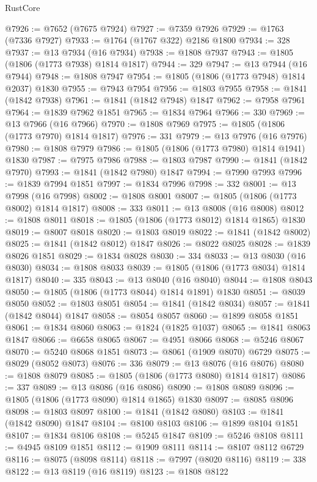 \begin{lexlean}{RustCore}
\begin{coremodule}
@7926 := @7652 (@7675 @7924)
@7927 := @7359 @7926
@7929 := @1763 (@7336 @7927)
@7933 := @1764 (@1767 @322) @2186 @1800
@7934 := 328
@7937 := @13 @7934 (@16 @7934)
@7938 := @1808 @7937
@7943 := @1805 (@1806 (@1773 @7938) @1814 @1817)
@7944 := 329
@7947 := @13 @7944 (@16 @7944)
@7948 := @1808 @7947
@7954 := @1805 (@1806 (@1773 @7948) @1814 @2037) @1830
@7955 := @7943 @7954
@7956 := @1803 @7955
@7958 := @1841 (@1842 @7938)
@7961 := @1841 (@1842 @7948) @1847
@7962 := @7958 @7961
@7964 := @1839 @7962 @1851
@7965 := @1834 @7964
@7966 := 330
@7969 := @13 @7966 (@16 @7966)
@7970 := @1808 @7969
@7975 := @1805 (@1806 (@1773 @7970) @1814 @1817)
@7976 := 331
@7979 := @13 @7976 (@16 @7976)
@7980 := @1808 @7979
@7986 := @1805 (@1806 (@1773 @7980) @1814 @1941) @1830
@7987 := @7975 @7986
@7988 := @1803 @7987
@7990 := @1841 (@1842 @7970)
@7993 := @1841 (@1842 @7980) @1847
@7994 := @7990 @7993
@7996 := @1839 @7994 @1851
@7997 := @1834 @7996
@7998 := 332
@8001 := @13 @7998 (@16 @7998)
@8002 := @1808 @8001
@8007 := @1805 (@1806 (@1773 @8002) @1814 @1817)
@8008 := 333
@8011 := @13 @8008 (@16 @8008)
@8012 := @1808 @8011
@8018 := @1805 (@1806 (@1773 @8012) @1814 @1865) @1830
@8019 := @8007 @8018
@8020 := @1803 @8019
@8022 := @1841 (@1842 @8002)
@8025 := @1841 (@1842 @8012) @1847
@8026 := @8022 @8025
@8028 := @1839 @8026 @1851
@8029 := @1834 @8028
@8030 := 334
@8033 := @13 @8030 (@16 @8030)
@8034 := @1808 @8033
@8039 := @1805 (@1806 (@1773 @8034) @1814 @1817)
@8040 := 335
@8043 := @13 @8040 (@16 @8040)
@8044 := @1808 @8043
@8050 := @1805 (@1806 (@1773 @8044) @1814 @1891) @1830
@8051 := @8039 @8050
@8052 := @1803 @8051
@8054 := @1841 (@1842 @8034)
@8057 := @1841 (@1842 @8044) @1847
@8058 := @8054 @8057
@8060 := @1899 @8058 @1851
@8061 := @1834 @8060
@8063 := @1824 (@1825 @1037)
@8065 := @1841 @8063 @1847
@8066 := @6658 @8065
@8067 := @4951 @8066
@8068 := @5246 @8067
@8070 := @5240 @8068 @1851
@8073 := @8061 (@1909 @8070) @6729
@8075 := @8029 (@8052 @8073)
@8076 := 336
@8079 := @13 @8076 (@16 @8076)
@8080 := @1808 @8079
@8085 := @1805 (@1806 (@1773 @8080) @1814 @1817)
@8086 := 337
@8089 := @13 @8086 (@16 @8086)
@8090 := @1808 @8089
@8096 := @1805 (@1806 (@1773 @8090) @1814 @1865) @1830
@8097 := @8085 @8096
@8098 := @1803 @8097
@8100 := @1841 (@1842 @8080)
@8103 := @1841 (@1842 @8090) @1847
@8104 := @8100 @8103
@8106 := @1899 @8104 @1851
@8107 := @1834 @8106
@8108 := @5245 @1847
@8109 := @5246 @8108
@8111 := @4945 @8109 @1851
@8112 := @1909 @8111
@8114 := @8107 @8112 @6729
@8116 := @8075 (@8098 @8114)
@8118 := @7997 (@8020 @8116)
@8119 := 338
@8122 := @13 @8119 (@16 @8119)
@8123 := @1808 @8122

\end{coremodule}
\end{lexlean}
